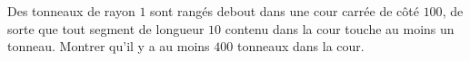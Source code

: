 Des tonneaux de rayon $1$ sont rangés debout dans une cour carrée de côté $100$, de sorte que tout segment de longueur $10$ contenu dans la cour touche au moins un tonneau. Montrer qu'il y a au moins $400$ tonneaux dans la cour.
